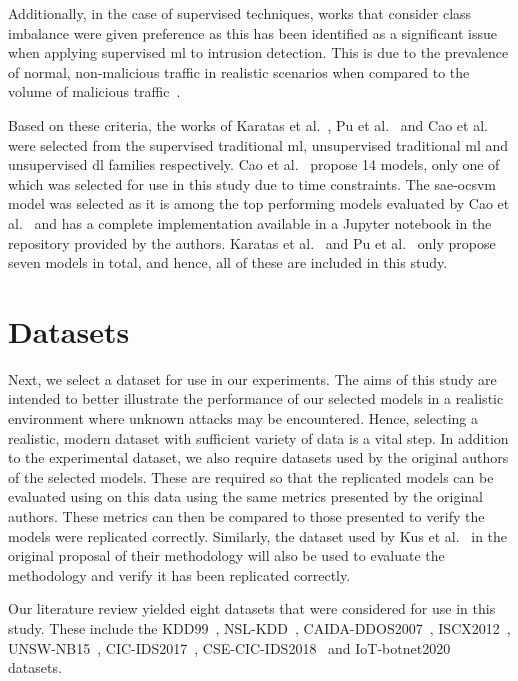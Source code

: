 Additionally, in the case of supervised techniques, works that consider class
imbalance were given preference as this has been identified as a significant
issue when applying supervised \gls{ml} to intrusion detection. This is due to
the prevalence of normal, non-malicious traffic in realistic scenarios when
compared to the volume of malicious traffic~\cite{imbalance_prob, imbalance}.

Based on these criteria, the works of Karatas et al.~\cite{Karatas}, Pu et
al.~\cite{Pu} and Cao et al.~\cite{Cao} were selected from the supervised
traditional \gls{ml}, unsupervised traditional \gls{ml} and unsupervised
\gls{dl} families respectively. Cao et al.~\cite{Cao} propose 14 models, only
one of which was selected for use in this study due to time constraints. The
\gls{sae}-\gls{ocsvm} model was selected as it is among the top performing
models evaluated by Cao et al.~\cite{Cao} and has a complete implementation
available in a Jupyter notebook in the repository provided by the authors.
Karatas et al.~\cite{Karatas} and Pu et al.~\cite{Pu} only propose seven models
in total, and hence, all of these are included in this study.

\section{Datasets}%
\label{sec:datasets}

Next, we select a dataset for use in our experiments. The aims of this study
are intended to better illustrate the performance of our selected models in a
realistic environment where unknown attacks may be encountered. Hence,
selecting a realistic, modern dataset with sufficient variety of data is a
vital step. In addition to the experimental dataset, we also require datasets
used by the original authors of the selected models. These are required so that
the replicated models can be evaluated using on this data using the same
metrics presented by the original authors. These metrics can then be compared
to those presented to verify the models were replicated correctly. Similarly,
the dataset used by Kus et al.~\cite{Kus} in the original proposal of their
methodology will also be used to evaluate the methodology and verify it has
been replicated correctly.

Our literature review yielded eight datasets that were considered for use in
this study. These include the KDD99~\cite{kdd99}, NSL-KDD~\cite{nsl},
CAIDA-DDOS2007~\cite{caida}, ISCX2012~\cite{iscx12}, UNSW-NB15~\cite{unsw15},
CIC-IDS2017~\cite{cic2017}, CSE-CIC-IDS2018~\cite{cic2018} and
IoT-botnet2020~\cite{iot_botnet20} datasets.

